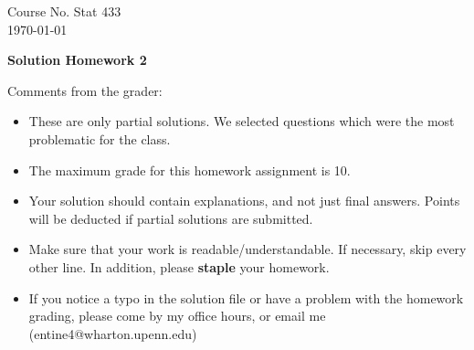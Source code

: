 \documentclass[10pt,a4paper]{article}
\begin{document}
\begin{flushleft}
Course No. Stat 433 \\
\today
\end{flushleft}

\begin{center}
{\Large{\bf Solution Homework 2}}
\end{center}

\textcolor[rgb]{0.98,0.00,0.00}{Comments from the grader:}
\begin{itemize}

    \item \textcolor[rgb]{0.98,0.00,0.00}{These are only partial solutions.  We selected
    questions which were the most problematic for the class.}
    \item \textcolor[rgb]{0.98,0.00,0.00}{The maximum grade for this homework assignment is 10.}
    \item \textcolor[rgb]{0.98,0.00,0.00}{Your solution should contain explanations, and not just
    final answers. Points will be deducted if partial solutions
    are submitted.}
    \item \textcolor[rgb]{0.98,0.00,0.00}{Make sure that your work is readable/understandable.  If necessary, skip every other line.  In addition, please {\bf staple} your homework.}
    \item \textcolor[rgb]{0.98,0.00,0.00}{If you notice a typo in the solution file or have a problem with the homework
    grading, please come by my office hours, or email me (entine4@wharton.upenn.edu)}

\end{itemize}
\end{document}
